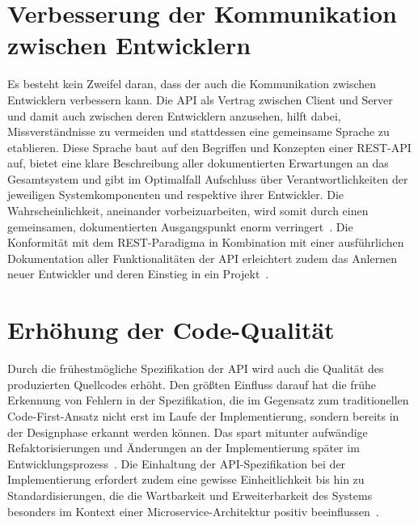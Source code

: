 \section{Verbesserung der Kommunikation zwischen Entwicklern}
Es besteht kein Zweifel daran, dass der \AFA auch die Kommunikation zwischen Entwicklern verbessern kann.
Die \ac{API} als Vertrag zwischen Client und Server und damit auch zwischen deren Entwicklern anzusehen, hilft dabei, Missverständnisse zu vermeiden und stattdessen eine gemeinsame Sprache zu etablieren. Diese Sprache baut auf den Begriffen und Konzepten einer \acs{REST}-\acs{API} auf, bietet eine klare Beschreibung aller dokumentierten Erwartungen an das Gesamtsystem und gibt im Optimalfall Aufschluss über Verantwortlichkeiten der jeweiligen Systemkomponenten und respektive ihrer Entwickler.
Die Wahrscheinlichkeit, aneinander vorbeizuarbeiten, wird somit durch einen gemeinsamen, dokumentierten Ausgangspunkt enorm verringert~\cite[1628]{cha21}.
Die Konformität mit dem \ac{REST}-Paradigma in Kombination mit einer ausführlichen Dokumentation aller Funktionalitäten der \ac{API} erleichtert zudem das Anlernen neuer Entwickler und deren Einstieg in ein Projekt~\cite[355]{de23}.

\section{Erhöhung der Code-Qualität}
Durch die frühestmögliche Spezifikation der \ac{API} wird auch die Qualität des produzierten Quellcodes erhöht.
Den größten Einfluss darauf hat die frühe Erkennung von Fehlern in der Spezifikation, die im Gegensatz zum traditionellen Code-First-Ansatz nicht erst im Laufe der Implementierung, sondern bereits in der Designphase erkannt werden können.
Das spart mitunter aufwändige Refaktorisierungen und Änderungen an der Implementierung später im Entwicklungsprozess~\cite{vol22}.
Die Einhaltung der \ac{API}-Spezifikation bei der Implementierung erfordert zudem eine gewisse Einheitlichkeit bis hin zu Standardisierungen, die die Wartbarkeit und Erweiterbarkeit des Systems besonders im Kontext einer Microservice-Architektur positiv beeinflussen~\cite[1628]{cha21}.